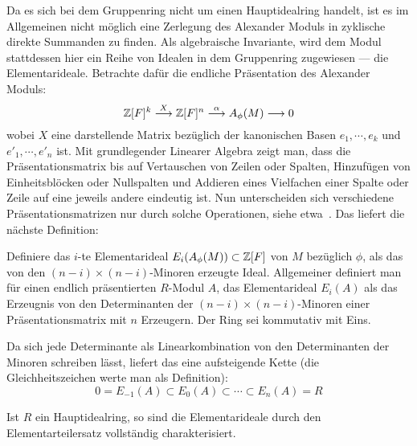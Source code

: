     	Da es sich bei dem Gruppenring nicht um einen Hauptidealring handelt, ist es im Allgemeinen nicht möglich eine Zerlegung des Alexander Moduls in zyklische direkte Summanden zu finden. Als algebraische Invariante, wird dem Modul stattdessen hier ein Reihe von Idealen in dem Gruppenring zugewiesen --- die Elementarideale. Betrachte dafür die endliche Präsentation des Alexander Moduls:
    	\[
    		\mathbb{Z}[F]^k \stackrel{X}{\longrightarrow} \mathbb{Z}[F]^n \stackrel{\alpha}{\longrightarrow} A_\phi(M) \longrightarrow 0
    	\]
    	wobei $X$ eine darstellende Matrix bezüglich der kanonischen Basen $e_1, \cdots , e_k$ und $e'_1, \cdots ,e'_n$ ist. Mit grundlegender Linearer Algebra zeigt man, dass die Präsentationsmatrix bis auf Vertauschen von Zeilen oder Spalten, Hinzufügen von Einheitsblöcken oder Nullspalten und Addieren eines Vielfachen einer Spalte oder Zeile auf eine jeweils andere eindeutig ist. Nun unterscheiden sich verschiedene Präsentationsmatrizen nur durch solche Operationen, siehe etwa~\cite[Theorem~6.1]{LickorishW.B.Raymond.1997}. Das liefert die nächste Definition:
    	\begin{defn}
    		Definiere das $i$-te Elementarideal $E_i(A_\phi(M)) \subset \mathbb{Z} [F]$ von $M$ bezüglich $\phi$, als das von den $(n-i)\times (n-i)$-Minoren erzeugte Ideal. Allgemeiner definiert man für einen endlich präsentierten $R$-Modul $A$, das Elementarideal $E_i(A)$ als das Erzeugnis von den Determinanten der $(n-i)\times (n-i)$-Minoren einer Präsentationsmatrix mit $n$ Erzeugern. Der Ring sei kommutativ mit Eins.
    	\end{defn}

        Da sich jede Determinante als Linearkombination von den Determinanten der Minoren schreiben lässt, liefert das eine aufsteigende Kette (die Gleichheitszeichen werte man als Definition):
        \[
             0=E_{-1}(A)\subset E_0(A) \subset \cdots \subset E_n(A) = R
         \] 

        \begin{bsp}
        \label{bsp:hauptidealelementarteiler}
            Ist $R$ ein Hauptidealring, so sind die Elementarideale durch den Elementarteilersatz vollständig charakterisiert.
        \end{bsp}

